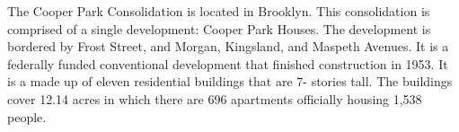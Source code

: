         

      

The Cooper Park Consolidation is located in Brooklyn. This consolidation is comprised of a single development: Cooper Park Houses. The development is bordered by Frost Street, and Morgan, Kingsland, and Maspeth Avenues. It is a federally funded conventional development that finished construction in 1953. It is a made up of eleven residential buildings that are 7- stories tall. The buildings cover 12.14 acres in which there are 696 apartments officially housing 1,538 people.    